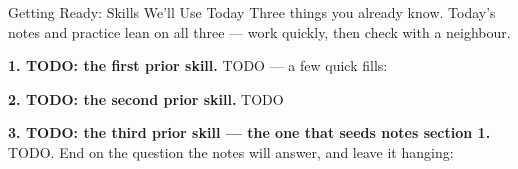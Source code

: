 \documentclass[12pt]{article}
\begin{document}

\vspace{0.10in}

\begin{notesbox}{Getting Ready: Skills We'll Use Today}
Three things you already know. Today's notes and practice lean on all three --- work quickly,
then check with a neighbour.

\vspace{6pt}
\textbf{1. TODO: the first prior skill.} TODO --- a few quick fills: \blank{1.2cm}

\vspace{8pt}
\textbf{2. TODO: the second prior skill.} TODO \blank{1.2cm}

\vspace{8pt}
\textbf{3. TODO: the third prior skill --- the one that seeds notes section 1.} TODO. End on the
question the notes will answer, and leave it hanging: \blank{1.6cm}
\end{notesbox}
\end{document}

